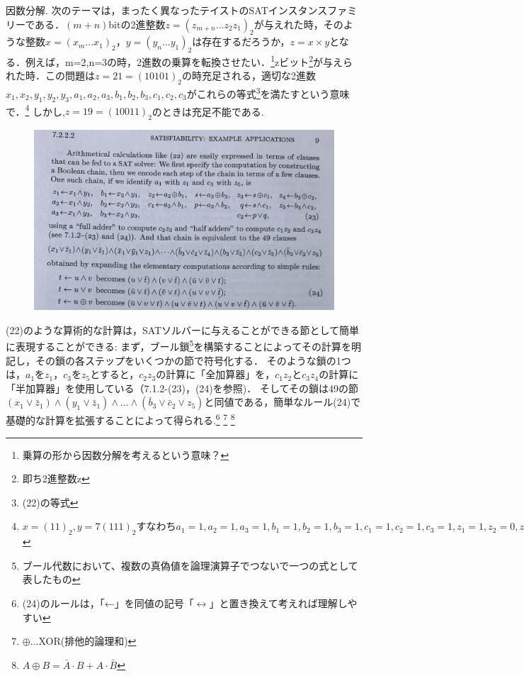 \documentclass[dvipdfmx,a4paper,12pt]{jsarticle}
\begin{document}
因数分解. 次のテーマは，まったく異なったテイストのSATインスタンスファミリーである．$(m+n)$bitの2進整数$z=(z_{m+n}...z_{2}z_{1})_{2}$が与えれた時，そのような整数$x=(x_{m}...x_{1})_{2}$，$y=(y_{n}...y_{1})_{2}$は存在するだろうか，$z=x×y$となる．例えば，m=2,n=3の時，2進数の乗算を転換させたい．\footnote{乗算の形から因数分解を考えるという意味？}zビット\footnote{即ち2進整数z}が与えられた時．この問題は$z=21=(10101)_{2}$の時充足される，適切な2進数$x_{1},x_{2},y_{1},y_{2},y_{3},a_{1},a_{2},a_{3},b_{1},b_{2},b_{3},c_{1},c_{2},c_{3}$がこれらの等式\footnote{(22)の等式}を満たすという意味で．\footnote{$x=(11)_{2},y=7(111)_{2}すなわちa_{1}=1,a_{2}=1,a_{3}=1,b_{1}=1,b_{2}=1,b_{3}=1,c_{1}=1,c_{2}=1,c_{3}=1,z_{1}=1,z_{2}=0,z_{3}=1,z_{4}=0,z_{5}=1$}
しかし,$z=19=(10011)_{2}$のときは充足不能である.
\newpage
\begin{figure}[htbp]
  \centering
  \includegraphics[width=130mm]{images/IMG_7380.jpg}
\end{figure}
(22)のような算術的な計算は，SATソルバーに与えることができる節として簡単に表現することができる: まず，ブール鎖\footnote{ブール代数において、複数の真偽値を論理演算子でつないで一つの式として表したもの}を構築することによってその計算を明記し，その鎖の各ステップをいくつかの節で符号化する．
そのような鎖の1つは，$a_{1}$を$z_{1}$，$c_{3}$を$z_{5}$とすると，$c_{2}z_{3}$の計算に「全加算器」を，$c_{1}z_{2}$と$c_{3}z_{4}$の計算に「半加算器」を使用している（7.1.2-(23)，(24)を参照)．
そしてその鎖は49の節$(x_{1}\vee \bar{z}_{1})\wedge(y_{1}\vee \bar{z}_{1})\wedge ... \wedge (\bar{b}_{3}\vee \bar{c}_{2} \vee z_{5})$と同値である，簡単なルール(24)で基礎的な計算を拡張することによって得られる.\footnote{(24)のルールは，「←」を同値の記号「$\leftrightarrow$」と置き換えて考えれば理解しやすい} \footnote{$\oplus$...XOR(排他的論理和)} \footnote{$A\oplus B = \bar{A} \cdot B+A\cdot \bar{B}$}
\end{document}
